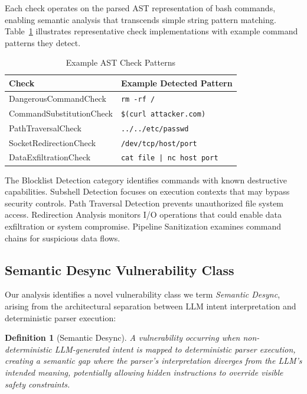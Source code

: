 \documentclass[10pt,conference]{IEEEtran}
\newtheorem{definition}{Definition}
\begin{document}
Each check operates on the parsed AST representation of bash commands, enabling semantic analysis that transcends simple string pattern matching. Table~\ref{tab:check-examples} illustrates representative check implementations with example command patterns they detect.

\begin{table}[htbp]
\caption{Example AST Check Patterns}
\label{tab:check-examples}
\centering
\small
\begin{tabular}{ll}
\toprule
\textbf{Check} & \textbf{Example Detected Pattern} \\
\midrule
DangerousCommandCheck & \texttt{rm -rf /} \\
CommandSubstitutionCheck & \texttt{\$(curl attacker.com)} \\
PathTraversalCheck & \texttt{../../etc/passwd} \\
SocketRedirectionCheck & \texttt{/dev/tcp/host/port} \\
DataExfiltrationCheck & \texttt{cat file | nc host port} \\
\bottomrule
\end{tabular}
\end{table}

The Blocklist Detection category identifies commands with known destructive capabilities. Subshell Detection focuses on execution contexts that may bypass security controls. Path Traversal Detection prevents unauthorized file system access. Redirection Analysis monitors I/O operations that could enable data exfiltration or system compromise. Pipeline Sanitization examines command chains for suspicious data flows.

\subsection{Semantic Desync Vulnerability Class}
\label{subsec:semantic-desync}

Our analysis identifies a novel vulnerability class we term \emph{Semantic Desync}, arising from the architectural separation between LLM intent interpretation and deterministic parser execution:

\begin{definition}[Semantic Desync]
A vulnerability occurring when non-deterministic LLM-generated intent is mapped to deterministic parser execution, creating a semantic gap where the parser's interpretation diverges from the LLM's intended meaning, potentially allowing hidden instructions to override visible safety constraints.
\end{definition}
\end{document}
